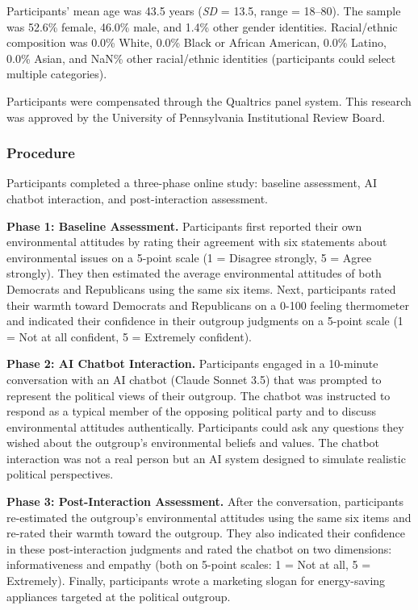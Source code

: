 \documentclass[
  11pt,
  oneside]{article}
\begin{document}
Participants' mean age was 43.5 years (\emph{SD} = 13.5, range =
18--80). The sample was 52.6\% female, 46.0\% male, and 1.4\% other
gender identities. Racial/ethnic composition was 0.0\% White, 0.0\%
Black or African American, 0.0\% Latino, 0.0\% Asian, and NaN\% other
racial/ethnic identities (participants could select multiple
categories).

Participants were compensated through the Qualtrics panel system. This
research was approved by the University of Pennsylvania Institutional
Review Board.

\subsubsection{Procedure}\label{procedure}

Participants completed a three-phase online study: baseline assessment,
AI chatbot interaction, and post-interaction assessment.

\textbf{Phase 1: Baseline Assessment.} Participants first reported their
own environmental attitudes by rating their agreement with six
statements about environmental issues on a 5-point scale (1 = Disagree
strongly, 5 = Agree strongly). They then estimated the average
environmental attitudes of both Democrats and Republicans using the same
six items. Next, participants rated their warmth toward Democrats and
Republicans on a 0-100 feeling thermometer and indicated their
confidence in their outgroup judgments on a 5-point scale (1 = Not at
all confident, 5 = Extremely confident).

\textbf{Phase 2: AI Chatbot Interaction.} Participants engaged in a
10-minute conversation with an AI chatbot (Claude Sonnet 3.5) that was
prompted to represent the political views of their outgroup. The chatbot
was instructed to respond as a typical member of the opposing political
party and to discuss environmental attitudes authentically. Participants
could ask any questions they wished about the outgroup's environmental
beliefs and values. The chatbot interaction was not a real person but an
AI system designed to simulate realistic political perspectives.

\textbf{Phase 3: Post-Interaction Assessment.} After the conversation,
participants re-estimated the outgroup's environmental attitudes using
the same six items and re-rated their warmth toward the outgroup. They
also indicated their confidence in these post-interaction judgments and
rated the chatbot on two dimensions: informativeness and empathy (both
on 5-point scales: 1 = Not at all, 5 = Extremely). Finally, participants
wrote a marketing slogan for energy-saving appliances targeted at the
political outgroup.
\end{document}
